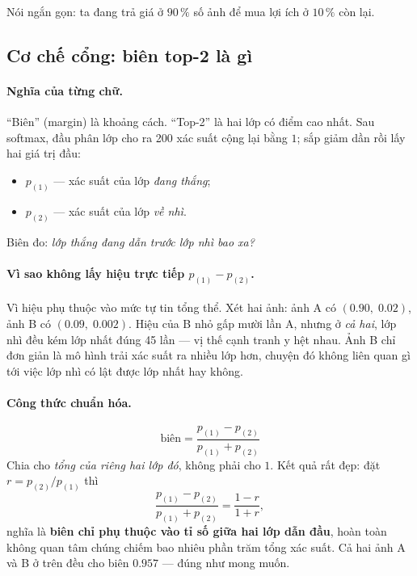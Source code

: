 \documentclass[11pt,a4paper]{article}
\begin{document}
Nói ngắn gọn: ta đang trả giá ở $90\,\%$ số ảnh để mua lợi ích ở $10\,\%$ còn lại.

\subsection{Cơ chế cổng: biên top-2 là gì}
\label{sec:cong}

\paragraph{Nghĩa của từng chữ.}
``Biên'' (margin) là khoảng cách. ``Top-2'' là hai lớp có điểm cao nhất. Sau
softmax, đầu phân lớp cho ra 200 xác suất cộng lại bằng $1$; sắp giảm dần rồi lấy
hai giá trị đầu:
\begin{itemize}
\item $p_{(1)}$ --- xác suất của lớp \emph{đang thắng};
\item $p_{(2)}$ --- xác suất của lớp \emph{về nhì}.
\end{itemize}
Biên đo: \emph{lớp thắng đang dẫn trước lớp nhì bao xa?}

\paragraph{Vì sao không lấy hiệu trực tiếp $p_{(1)} - p_{(2)}$.}
Vì hiệu phụ thuộc vào mức tự tin tổng thể. Xét hai ảnh: ảnh A có
$(0.90,\; 0.02)$, ảnh B có $(0.09,\; 0.002)$. Hiệu của B nhỏ gấp mười lần A,
nhưng ở \emph{cả hai}, lớp nhì đều kém lớp nhất đúng 45 lần --- vị thế cạnh tranh
y hệt nhau. Ảnh B chỉ đơn giản là mô hình trải xác suất ra nhiều lớp hơn, chuyện
đó không liên quan gì tới việc lớp nhì có lật được lớp nhất hay không.

\paragraph{Công thức chuẩn hóa.}
\[ \text{biên} = \frac{p_{(1)} - p_{(2)}}{p_{(1)} + p_{(2)}} \]
Chia cho \emph{tổng của riêng hai lớp đó}, không phải cho $1$. Kết quả rất đẹp:
đặt $r = p_{(2)}/p_{(1)}$ thì
\[ \frac{p_{(1)} - p_{(2)}}{p_{(1)} + p_{(2)}} = \frac{1 - r}{1 + r} , \]
nghĩa là \textbf{biên chỉ phụ thuộc vào tỉ số giữa hai lớp dẫn đầu}, hoàn toàn
không quan tâm chúng chiếm bao nhiêu phần trăm tổng xác suất. Cả hai ảnh A và B ở
trên đều cho biên $0.957$ --- đúng như mong muốn.
\end{document}

